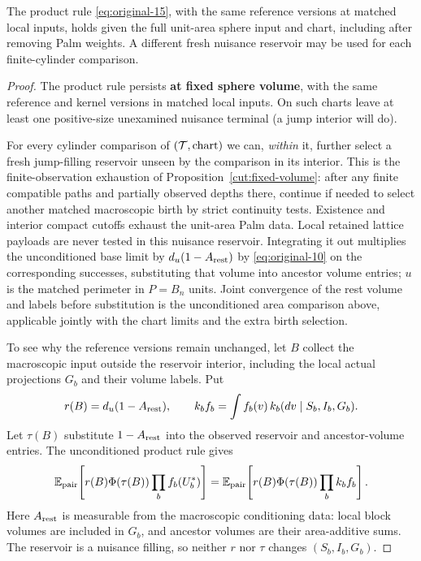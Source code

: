 \begin{proposition}\label{kern:fixed-volume}
The product rule \eqref{eq:original-15}, with the same reference versions at matched local
inputs, holds given the full unit-area sphere input and chart, including after removing Palm
weights. A different fresh nuisance reservoir may be used for each finite-cylinder comparison.
\end{proposition}
\begin{proof}

The product rule persists \textbf{at fixed sphere volume}, with the same reference and kernel versions in
matched local inputs. On such charts leave at least one positive-size unexamined nuisance terminal (a jump
interior will do).

For every cylinder comparison of \(({\cal T},\text{chart})\) we can, \emph{within} it,
further select a fresh jump-filling reservoir unseen by the comparison in its interior. This is the finite-observation exhaustion of Proposition~\ref{cut:fixed-volume}: after any finite compatible paths and
partially observed depths there, continue if needed to select another matched macroscopic birth by strict
continuity tests. Existence and interior compact cutoffs exhaust the unit-area Palm data. Local retained
lattice payloads are never tested in this nuisance reservoir. Integrating it out multiplies the
unconditioned base limit by \(d_u(1-A_{\rm rest})\) by \eqref{eq:original-10} on the corresponding
successes, substituting that volume into ancestor volume entries; \(u\) is the matched perimeter in
\(P=B_n\) units. Joint convergence of the rest volume and labels before substitution is the unconditioned
area comparison above, applicable jointly with the chart limits and the extra birth selection.

To see why the reference versions remain unchanged, let $B$ collect the
macroscopic input outside the reservoir interior, including the local actual
projections $G_b$ and their volume labels. Put
\[
 r(B)=d_u(1-A_{\rm rest}),\qquad
 k_b f_b=\int f_b(v)\,k_b(dv\mid S_b,I_b,G_b).
\]
Let $\tau(B)$ substitute $1-A_{\rm rest}$ into the observed reservoir and
ancestor-volume entries. The unconditioned product rule gives
\[
 \mathbb E_{\rm pair}\!\left[r(B)\Phi(\tau(B))\prod_b f_b(U_b^*)\right]
 =\mathbb E_{\rm pair}\!\left[r(B)\Phi(\tau(B))\prod_b k_bf_b\right].
\]
Here $A_{\rm rest}$ is measurable from the macroscopic conditioning data:
local block volumes are included in $G_b$, and ancestor volumes are their
area-additive sums. The reservoir is a nuisance filling, so neither $r$ nor
$\tau$ changes $(S_b,I_b,G_b)$.


\end{proof}
